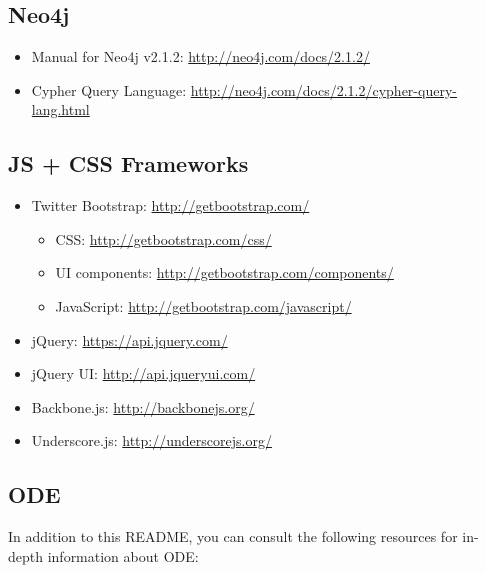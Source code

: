 \documentclass[11pt]{article}
\begin{document}
\subsection{Neo4j}
\label{sec-4-2}
\begin{itemize}
\item Manual for Neo4j v2.1.2:
\url{http://neo4j.com/docs/2.1.2/}
\item Cypher Query Language:
\url{http://neo4j.com/docs/2.1.2/cypher-query-lang.html}
\end{itemize}

\subsection{JS + CSS Frameworks}
\label{sec-4-3}
\begin{itemize}
\item Twitter Bootstrap: \url{http://getbootstrap.com/}
\begin{itemize}
\item CSS: \url{http://getbootstrap.com/css/}
\item UI components: \url{http://getbootstrap.com/components/}
\item JavaScript: \url{http://getbootstrap.com/javascript/}
\end{itemize}
\item jQuery: \url{https://api.jquery.com/}
\item jQuery UI: \url{http://api.jqueryui.com/}
\item Backbone.js: \url{http://backbonejs.org/}
\item Underscore.js: \url{http://underscorejs.org/}
\end{itemize}

\subsection{ODE}
\label{sec-4-4}
In addition to this README, you can consult the following resources
for in-depth information about ODE:
\end{document}
